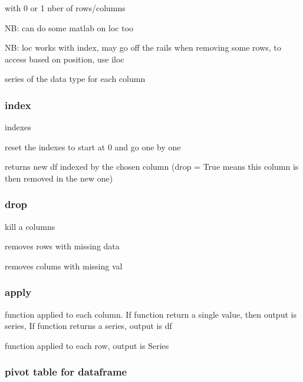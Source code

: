 			 with 0 or 1 nber of rows/columns

			NB: can do some matlab on loc too

			NB: loc works with index, may go off the rails when removing some rows, to access based on position, use iloc 

			 series of the data type for each column


		\subsubsection{index}
			
			 indexes

			 reset the indexes to start at 0 and go one by one

			 returns new df indexed by the chosen column (drop = True means this column  is then removed in the new one)

		\subsubsection{drop}

			 kill a columns

			 removes rows with missing data


			 removes colums with missing val


		\subsubsection{apply}
			
			 function applied to each column. If function return a single value, then output is series, If function returns a series, output is df

			 function applied to each row, output is Series

	\subsubsection{pivot table for dataframe}

